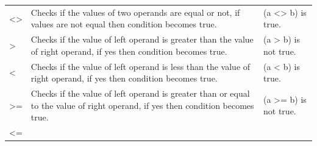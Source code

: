 \documentclass[]{book}
\theoremstyle{definition}
\theoremstyle{definition}
\theoremstyle{definition}
\theoremstyle{remark}
\begin{document}
\begin{longtable}[]{@{}lll@{}}
\begin{minipage}[t]{0.09\columnwidth}
\textless{}\textgreater{}\strut
\end{minipage} & \begin{minipage}[t]{0.69\columnwidth}\raggedright
Checks if the values of two operands are equal or not, if values are not
equal then condition becomes true.\strut
\end{minipage} & \begin{minipage}[t]{0.13\columnwidth}\raggedright
(a \textless{}\textgreater{} b) is true.\strut
\end{minipage}\tabularnewline
\begin{minipage}[t]{0.09\columnwidth}\raggedright
\textgreater{}\strut
\end{minipage} & \begin{minipage}[t]{0.69\columnwidth}\raggedright
Checks if the value of left operand is greater than the value of right
operand, if yes then condition becomes true.\strut
\end{minipage} & \begin{minipage}[t]{0.13\columnwidth}\raggedright
(a \textgreater{} b) is not true.\strut
\end{minipage}\tabularnewline
\begin{minipage}[t]{0.09\columnwidth}\raggedright
\textless{}\strut
\end{minipage} & \begin{minipage}[t]{0.69\columnwidth}\raggedright
Checks if the value of left operand is less than the value of right
operand, if yes then condition becomes true.\strut
\end{minipage} & \begin{minipage}[t]{0.13\columnwidth}\raggedright
(a \textless{} b) is true.\strut
\end{minipage}\tabularnewline
\begin{minipage}[t]{0.09\columnwidth}\raggedright
\textgreater{}=\strut
\end{minipage} & \begin{minipage}[t]{0.69\columnwidth}\raggedright
Checks if the value of left operand is greater than or equal to the
value of right operand, if yes then condition becomes true.\strut
\end{minipage} & \begin{minipage}[t]{0.13\columnwidth}\raggedright
(a \textgreater{}= b) is not true.\strut
\end{minipage}\tabularnewline
\begin{minipage}[t]{0.09\columnwidth}\raggedright
\textless{}=\strut
\end{minipage} & \begin{minipage}[t]{0.69\columnwidth}\raggedright

\end{minipage}
\end{longtable}
\end{document}

